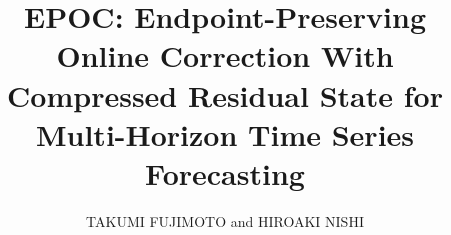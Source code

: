 \title{EPOC: Endpoint-Preserving Online Correction With Compressed Residual State for Multi-Horizon Time Series Forecasting}
\author{\uppercase{Takumi Fujimoto} and \uppercase{Hiroaki Nishi}}
\address[1]{School of Science for Open and Environmental Systems, Graduate School of Science and Technology, Keio University, Yokohama 223-8522, Japan}
\address[2]{Department of System Design, Faculty of Science and Technology, Keio University, Yokohama 223-8522, Japan}
